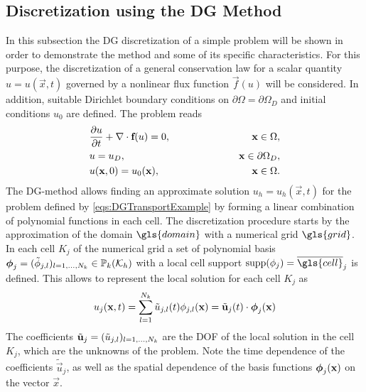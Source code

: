 \subsection{Discretization using the DG Method} \label{sec:DiscWithDG}
In this subsection the DG discretization of a simple problem will be shown in order to demonstrate the method and some of its specific characteristics. For this purpose, the discretization of a general conservation law for a scalar quantity $u = u(\vec{x},t)$ governed by a nonlinear flux function $\vec{f}(u)$ will be considered. In addition, suitable Dirichlet boundary conditions on $\partial \Omega = \partial \Omega_D$ and initial conditions $u_0$ are defined. The problem reads
\begin{subequations}
\begin{align}
&\frac{\partial u}{\partial t} + \nabla \cdot \textbf{f}(u) = 0, \qquad\qquad\qquad &\textbf{x} \in \Omega,\label{eq:consEqDG}\\
&u = u_D, \qquad \qquad \qquad  &\textbf{x} \in \partial \Omega_D,\\
&u(\textbf{x},0) = u_0(\textbf{x}), \qquad\qquad\qquad &\textbf{x}\in\Omega.
\end{align}\label{eqs:DGTransportExample}
\end{subequations}
The DG-method allows finding an approximate solution $u_h = u_h(\vec{x},t)$ for the problem defined by \cref{eqs:DGTransportExample} by forming a linear combination of polynomial functions in each cell.  The discretization procedure starts by the approximation of the domain $\gls{domain}$ with a numerical grid $\gls{grid}$. In each cell $K_j$ of the numerical grid a set of polynomial basis $\boldsymbol{\mathbf{\phi}}_j = (\tilde{\phi}_{j,l})_{l=1,\dots,N_k} \in \mathbb{P}_k(\mathcal{K}_h)$ with a local cell support $\text{supp}(\phi_j) = \overline{\gls{cell}}_j$ is defined. This allows to represent the local solution for each cell $K_j$ as
\begin{equation}
u_j(\textbf{x},t) = \sum_{l=1}^{N_k}\tilde{u}_{j,l}(t)\phi_{j,l}(\textbf{x}) = \tilde{\textbf{u}}_j(t) \cdot \boldsymbol{\mathbf{\phi}}_j (\textbf{x})\label{eq:DGAnsatz}
\end{equation}
The coefficients $\tilde{\boldsymbol{\mathbf{u}}}_j = (\tilde{u}_{j,l})_{l=1,\dots,N_k}$ are the \gls{DOF} of the local solution in the cell $K_j$, which are the unknowns of the problem. Note the time dependence of the coefficients $\tilde{\vec{u}}_j$, as well as the spatial dependence of the basis functions $\boldsymbol{\mathbf{\phi}}_j (\textbf{x})$ on the vector $\vec{x}$. 


